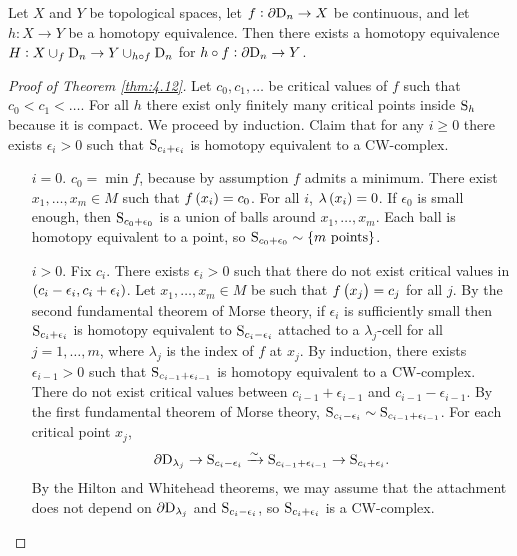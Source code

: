 \begin{theorem}[Hilton]
Let $ X $ and $ Y $ be topological spaces, let $ f : \partial\D_n \to X $ be continuous, and let $ h : X \to Y $ be a homotopy equivalence. Then there exists a homotopy equivalence $ H : X \cup_f \D_n \to Y \cup_{h \circ f} \D_n $ for $ h \circ f : \partial\D_n \to Y $.
\end{theorem}

\begin{proof}[Proof of Theorem \ref{thm:4.12}]
Let $ c_0, c_1, \dots $ be critical values of $ f $ such that $ c_0 < c_1 < \dots $. For all $ h $ there exist only finitely many critical points inside $ \S_h $ because it is compact. We proceed by induction. Claim that for any $ i \ge 0 $ there exists $ \epsilon_i > 0 $ such that $ \S_{c_i + \epsilon_i} $ is homotopy equivalent to a CW-complex.
\begin{itemize}[leftmargin=0.5in]
\item[$ i = 0 $.] $ c_0 = \min f $, because by assumption $ f $ admits a minimum. There exist $ x_1, \dots, x_m \in M $ such that $ f\br{x_i} = c_0 $. For all $ i $, $ \lambda\br{x_i} = 0 $. If $ \epsilon_0 $ is small enough, then $ \S_{c_0 + \epsilon_0} $ is a union of balls around $ x_1, \dots, x_m $. Each ball is homotopy equivalent to a point, so $ \S_{c_0 + \epsilon_0} \sim \cbr{m \ \text{points}} $.
\item[$ i > 0 $.] Fix $ c_i $. There exists $ \epsilon_i > 0 $ such that there do not exist critical values in $ \br{c_i - \epsilon_i, c_i + \epsilon_i} $. Let $ x_1, \dots, x_m \in M $ be such that $ f\br{x_j} = c_j $ for all $ j $. By the second fundamental theorem of Morse theory, if $ \epsilon_i $ is sufficiently small then $ \S_{c_i + \epsilon_i} $ is homotopy equivalent to $ \S_{c_i - \epsilon_i} $ attached to a $ \lambda_j $-cell for all $ j = 1, \dots, m $, where $ \lambda_j $ is the index of $ f $ at $ x_j $. By induction, there exists $ \epsilon_{i - 1} > 0 $ such that $ \S_{c_{i - 1} + \epsilon_{i - 1}} $ is homotopy equivalent to a CW-complex. There do not exist critical values between $ c_{i - 1} + \epsilon_{i - 1} $ and $ c_{i - 1} - \epsilon_{i - 1} $. By the first fundamental theorem of Morse theory, $ \S_{c_i - \epsilon_i} \sim \S_{c_{i - 1} + \epsilon_{i - 1}} $. For each critical point $ x_j $,
$$ \partial\D_{\lambda_j} \to \S_{c_i - \epsilon_i} \xrightarrow{\sim} \S_{c_{i - 1} + \epsilon_{i - 1}} \to \S_{c_i + \epsilon_i}. $$
By the Hilton and Whitehead theorems, we may assume that the attachment does not depend on $ \partial\D_{\lambda_j} $ and $ \S_{c_i - \epsilon_i} $, so $ \S_{c_i + \epsilon_i} $ is a CW-complex.
\end{itemize}
\end{proof}

